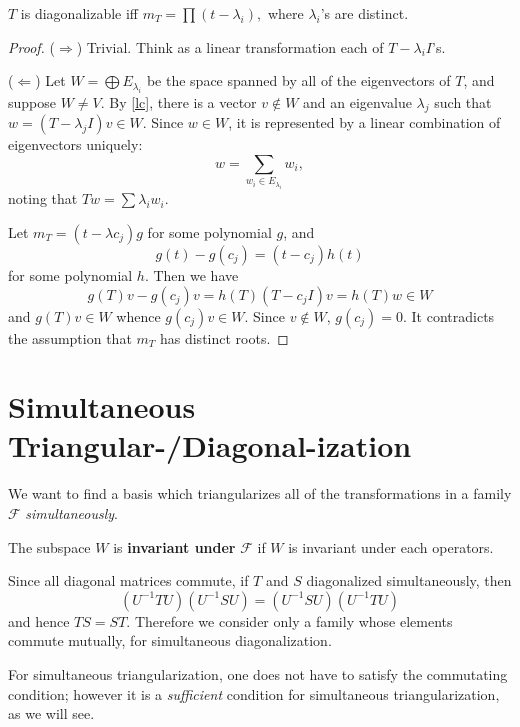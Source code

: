 \begin{theorem}$T$ is diagonalizable iff $m_T = \prod (t-\lambda_i),$ where $\lambda_i$'s are distinct.\end{theorem}
\begin{proof}
($\Longrightarrow$) Trivial. Think as a linear transformation each of $T-\lambda_i I$'s.

($\Longleftarrow$) Let $W=\bigoplus E_{\lambda_i}$ be the space spanned by all of the eigenvectors of $T$, and suppose $W \ne V$. By \cref{lc}, there is a vector $v\not \in W$ and an eigenvalue $\lambda_j$ such that $w = (T-\lambda_j I)v \in W$. Since $w\in W$, it is represented by a linear combination of eigenvectors uniquely: $$w = \sum_{w_i \in  E_{\lambda_i}} w_i,$$noting that $T w = \sum \lambda_i w_i.$ 

Let $m_T = (t-\lambda c_j) g$ for some polynomial $g$, and $$g(t) - g(c_j) = (t - c_j)h(t)$$ for some polynomial $h$. Then we have $$g(T)v - g(c_j)v = h(T)(T-c_j I)v = h(T)w \in W$$ and $g(T)v \in W$ whence $g(c_j)v \in W.$ Since $v\not\in W$, $g(c_j) = 0.$ It contradicts the assumption that $m_T$ has distinct roots.
\end{proof}

\section{Simultaneous Triangular-/Diagonal-ization}
We want to find a basis which triangularizes all of the transformations in a family $\mathscr F$ \textit{simultaneously}.

The subspace $W$ is \textbf{invariant under} $ {\mathscr F}$ if $W$ is invariant under each operators.

Since all diagonal matrices commute, if $T$ and $S$ diagonalized simultaneously, then$$(U^{-1}TU)(U^{-1}SU) = (U^{-1}SU)(U^{-1}TU)$$ and hence $TS = ST.$ Therefore we consider only a family whose elements commute mutually, for simultaneous diagonalization.

For simultaneous triangularization, one does not have to satisfy the commutating condition; however it is a \textit{sufficient} condition for simultaneous triangularization, as we will see.

